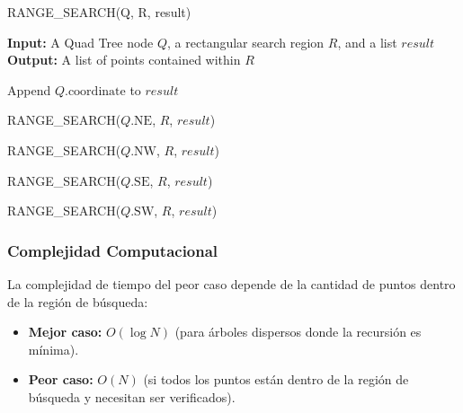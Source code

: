 \documentclass[9pt,a4paper,twoside]{rho-class/rho}
\begin{document}
            \begin{algorithm}
                \caption{RANGE\_SEARCH(Q, R, result)}
                \begin{algorithmic}[1]
                    \Statex \textbf{Input:} A Quad Tree node $Q$, a rectangular search region $R$, and a list $result$
                    \Statex \textbf{Output:} A list of points contained within $R$
                    
                        \State \Return {}
                    \EndIf
                    
                        \State Append $Q.\text{coordinate}$ to $result$ 
                    \EndIf
                    
                        \State RANGE\_SEARCH($Q.\text{NE}$, $R$, $result$)
                    \EndIf
                    
                        \State RANGE\_SEARCH($Q.\text{NW}$, $R$, $result$)
                    \EndIf
                    
                        \State RANGE\_SEARCH($Q.\text{SE}$, $R$, $result$)
                    \EndIf
                    
                        \State RANGE\_SEARCH($Q.\text{SW}$, $R$, $result$)
                    \EndIf
                    
                    \State \Return {}
                
                \end{algorithmic}
            \end{algorithm}
            
        \subsubsection{Complejidad Computacional}
                La complejidad de tiempo del peor caso depende de la cantidad de puntos dentro de la región de búsqueda:
                \begin{itemize}
                \item \textbf{Mejor caso:} $O(\log N)$ (para árboles dispersos donde la recursión es mínima).
                \item \textbf{Peor caso:} $O(N)$ (si todos los puntos están dentro de la región de búsqueda y necesitan ser verificados).
                \end{itemize}
\end{document}

